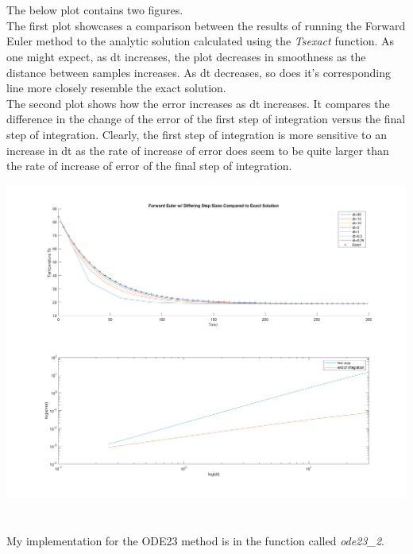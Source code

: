 \documentclass[10pt,a4paper]{article}
\begin{document}
\clearpage

\section{}

The below plot contains two figures. \\

\noindent
The first plot showcases a comparison between the results of running the Forward Euler method to the analytic solution calculated using the \emph{Tsexact} function. As one might expect, as dt increases, the plot decreases in smoothness as the distance between samples increases. As dt decreases, so does it's corresponding line more closely resemble the exact solution. \\

\noindent
The second plot shows how the error increases as dt increases. It compares the difference in the change of the error of the first step of integration versus the final step of integration. Clearly, the first step of integration is more sensitive to an increase in dt as the rate of increase of error does seem to be quite larger than the rate of increase of error of the final step of integration.

\begin{center}
\includegraphics[scale=0.2]{for_eul_vs_exact_cup_cool.png}\\
\end{center}

\clearpage

\section{}
My implementation for the ODE23 method is in the function called \emph{ode23\_2}.
\end{document}
